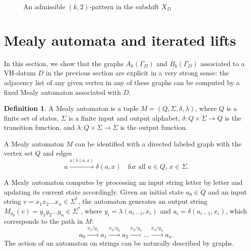 \documentclass[12pt]{article}
\theoremstyle{definition}
\newtheorem{definition}{Definition}
\begin{document}
\begin{figure}[t]
\begin{center}
\end{center}
\caption{An admissible $(k,2)$-pattern in the subshift $X_D$}\label{fig:(k,2)-pattern in X_D}
\end{figure}


\section{Mealy automata and iterated lifts}

In this section, we show that the graphs $A_k(\Gamma_D)$ and $B_k(\Gamma_D)$ associated to a VH-datum $D$ in the previous section are explicit in a very strong sense: the adjacency list of any given vertex in any of these graphs can be computed by a fixed Mealy automaton associated with $D$.

\begin{definition}
A Mealy automaton is a tuple $M=(Q,\Sigma,\delta,\lambda)$, where $Q$ is a finite set of states, $\Sigma$ is a finite input and output alphabet, $\delta:Q\times\Sigma\rightarrow Q$ is the transition function, and $\lambda:Q\times\Sigma\rightarrow \Sigma$ is the output function.

A Mealy automaton $M$ can be identified with a directed labeled graph with the vertex set $Q$ and edges
\[
a \xrightarrow{x \,|\, \lambda(a,x)} \delta(a,x) \quad \text{for all } a \in Q,\, x \in \Sigma.
\]
\end{definition}

A Mealy automaton computes by processing an input string letter by letter and updating its current state accordingly. Given an initial state $a_0\in Q$ and an input string $v=x_1x_2\ldots x_n\in\Sigma^{*}$, the automaton generates an output string $M_{a_0}(v)=y_1y_2\ldots y_n\in\Sigma^{*}$, where $y_i=\lambda(a_{i-1},x_i)$ and $a_i=\delta(a_{i-1},x_i)$, which corresponds to the path in $M$:
\begin{equation*}\label{eqn:action_Mealy}
a_0\xrightarrow{x_1/y_1}a_1\xrightarrow{x_2/y_2}a_2\xrightarrow{x_3/y_3}\ldots\xrightarrow{x_n/y_n}a_n.
\end{equation*}
The action of an automaton on strings can be naturally described by graphs.
\end{document}
